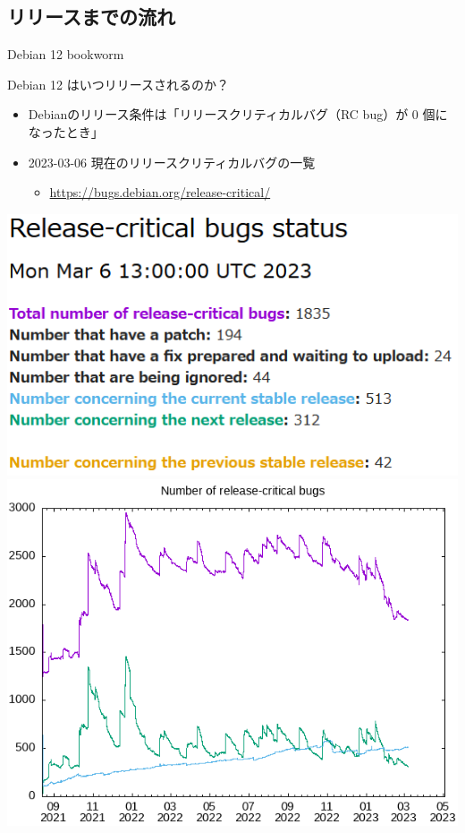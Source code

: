 \subsection{リリースまでの流れ}

\begin{frame}{Debian 12 bookworm}%

Debian 12 はいつリリースされるのか？

\begin{itemize}
\item Debianのリリース条件は「リリースクリティカルバグ（RC bug）が 0 個になったとき」
\item 2023-03-06 現在のリリースクリティカルバグの一覧
  \begin{itemize}
  \item \url{https://bugs.debian.org/release-critical/}
  \end{itemize}
\end{itemize}

\begin{center}
  \includegraphics[width=0.45\hsize]{image202303/debian-rcbug-1_20230306.png}
  \includegraphics[width=0.45\hsize]{image202303/debian-rcbug-2_20230306.png}
\end{center}

\end{frame}


